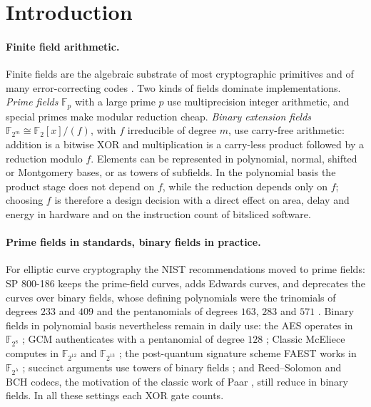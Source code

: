 \documentclass[11pt,a4paper]{article}
\theoremstyle{plain}
\theoremstyle{definition}
\newcommand{\F}{\mathbb{F}}
\newcommand{\Ftm}{\F_{2^m}}
\begin{document}
\section{Introduction}\label{sec:intro}

\paragraph{Finite field arithmetic.}
Finite fields are the algebraic substrate of most cryptographic primitives and of many
error-correcting codes \cite{LidlNiederreiter1997,HMV2004}. Two kinds of fields dominate
implementations. \emph{Prime fields} $\F_p$ with a large prime $p$ use multiprecision
integer arithmetic, and special primes make modular reduction cheap. \emph{Binary
extension fields} $\Ftm\cong\F_2[x]/(f)$, with $f$ irreducible of degree $m$, use
carry-free arithmetic: addition is a bitwise XOR and multiplication is a carry-less
product followed by a reduction modulo $f$. Elements can be represented in polynomial,
normal, shifted or Montgomery bases, or as towers of subfields. In the polynomial basis
the product stage does not depend on $f$, while the reduction depends only on $f$;
choosing $f$ is therefore a design decision with a direct effect on area, delay and
energy in hardware and on the instruction count of bitsliced software.

\paragraph{Prime fields in standards, binary fields in practice.}
For elliptic curve cryptography the NIST recommendations moved to prime fields: SP
800-186 keeps the prime-field curves, adds Edwards curves, and deprecates the curves
over binary fields, whose defining polynomials were the trinomials of degrees $233$ and
$409$ and the pentanomials of degrees $163$, $283$ and $571$ \cite{SP800186,FIPS1865}.
Binary fields in polynomial basis nevertheless remain in daily use: the AES operates in
$\F_{2^8}$ \cite{FIPS197}; GCM authenticates with a pentanomial of degree $128$
\cite{SP80038D,GueronKounavis2010}; Classic McEliece computes in $\F_{2^{12}}$ and
$\F_{2^{13}}$ \cite{ClassicMcEliece2022,McBits2013}; the post-quantum signature scheme
FAEST works in $\F_{2^\lambda}$ \cite{FAEST2023}; succinct arguments use towers of binary
fields \cite{DiamondPosen2025}; and Reed--Solomon and BCH codecs, the motivation of the
classic work of Paar \cite{Paar1997}, still reduce in binary fields. In all these
settings each XOR gate counts.
\end{document}
